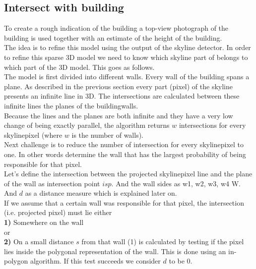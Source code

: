 \documentclass[10pt]{article}
\begin{document}

\subsection{Intersect with building}
To create a rough indication of the building a top-view photograph of the
building is used together with an estimate of the height of the building.\\ 
The idea is to refine this model using the output of the skyline detector.
In order to refine this sparse 3D model we need to know which skyline part of belongs to which part of
the 3D model. This goes as follows.\\
The model is first divided into different walls.  Every wall of the building spans a plane. 
As described in the previous section every part (pixel) of the skyline presents an infinite line in 3D.
The intersections are calculated between these infinite lines the planes of the buildingwalls.\\
Because the lines and the planes are both infinite and they have a very low change
of being exactly parallel, the algorithm returns $w$ intersections for every
skylinepixel (where $w$ is the number of walls).\\
Next challenge is to reduce the number of intersection for every skylinepixel
to one. In other words determine the wall that has the largest probability of
being responsible for that pixel.\\

Let's define the intersection between the projected skylinepixel line and the
plane of the wall as intersection point $isp$. And the wall sides as {w1, w2,
w3, w4 \in W}. And $d$ as a distance measure which is explained later on.\\ If
we assume that a certain wall was responsible for that pixel, the intersection
(i.e. projected pixel) must lie either\\

\textbf{1)} Somewhere on the wall 
\\
or
\\
\textbf{2)} On a small distance $s$ from that wall
(1) is calculated by testing if the pixel lies inside the polygonal
representation of the wall. This is done using an in-polygon algorithm. If this
test succeeds we consider $d$ to be 0.\\
\end{document}
